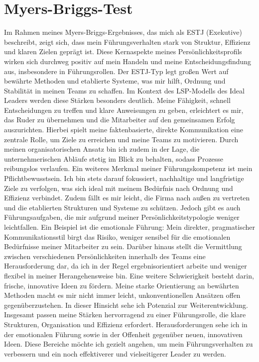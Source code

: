 \section{Myers-Briggs-Test}
Im Rahmen meines Myers-Briggs-Ergebnisses, das mich als ESTJ (Exekutive) beschreibt, zeigt sich, dass mein Führungsverhalten stark von Struktur, Effizienz und klaren Zielen geprägt ist. Diese Kernaspekte meines Persönlichkeitsprofils wirken sich durchweg positiv auf mein Handeln und meine Entscheidungsfindung aus, insbesondere in Führungsrollen. Der ESTJ-Typ legt großen Wert auf bewährte Methoden und etablierte Systeme, was mir hilft, Ordnung und Stabilität in meinen Teams zu schaffen.
Im Kontext des LSP-Modells des  \glqq Ideal Leaders\grqq{} werden diese Stärken besonders deutlich. Meine Fähigkeit, schnell Entscheidungen zu treffen und klare Anweisungen zu geben, erleichtert es mir, das Ruder zu übernehmen und die Mitarbeiter auf den gemeinsamen Erfolg auszurichten. Hierbei spielt meine faktenbasierte, direkte Kommunikation eine zentrale Rolle, um Ziele zu erreichen und meine Teams zu motivieren. Durch meinen organisatorischen Ansatz bin ich zudem in der Lage, die unternehmerischen Abläufe stetig im Blick zu behalten, sodass Prozesse reibungslos verlaufen.
Ein weiteres Merkmal meiner Führungskompetenz ist mein Pflichtbewusstsein. Ich bin stets darauf fokussiert, nachhaltige und langfristige Ziele zu verfolgen, was sich ideal mit meinem Bedürfnis nach Ordnung und Effizienz verbindet. Zudem fällt es mir leicht, die Firma nach außen zu vertreten und die etablierten Strukturen und Systeme zu schützen.
Jedoch gibt es auch Führungsaufgaben, die mir aufgrund meiner Persönlichkeitstypologie weniger leichtfallen. Ein Beispiel ist die emotionale Führung: Mein direkter, pragmatischer Kommunikationsstil birgt das Risiko, weniger sensibel für die emotionalen Bedürfnisse meiner Mitarbeiter zu sein. Darüber hinaus stellt die Vermittlung zwischen verschiedenen Persönlichkeiten innerhalb des Teams eine Herausforderung dar, da ich in der Regel ergebnisorientiert arbeite und weniger flexibel in meiner Herangehensweise bin.
Eine weitere Schwierigkeit besteht darin, frische, innovative Ideen zu fördern. Meine starke Orientierung an bewährten Methoden macht es mir nicht immer leicht, unkonventionellen Ansätzen offen gegenüberzustehen. In dieser Hinsicht sehe ich Potenzial zur Weiterentwicklung.
Insgesamt passen meine Stärken hervorragend zu einer Führungsrolle, die klare Strukturen, Organisation und Effizienz erfordert. Herausforderungen sehe ich in der emotionalen Führung sowie in der Offenheit gegenüber neuen, innovativen Ideen. Diese Bereiche möchte ich gezielt angehen, um mein Führungsverhalten zu verbessern und ein noch effektiverer und vielseitigerer Leader zu werden.
\newpage